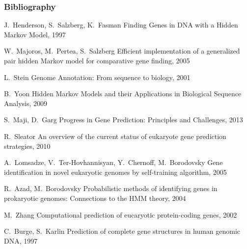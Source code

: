 \documentclass{beamer}[12pt]
\begin{document}
\begin{frame}[allowframebreaks]
  \frametitle<presentation>{Bibliography}    
  \begin{thebibliography}{10}   
	\beamertemplatearticlebibitems
	\bibitem{}
	J.~Henderson, S.~Salzberg, K.~Fasman
	\newblock Finding Genes in DNA with a Hidden Markov Model, 1997
	
	\beamertemplatearticlebibitems
	\bibitem{}
	W.~Majoros, M.~Pertea, S.~Salzberg
	\newblock Efficient implementation of a generalized pair hidden Markov model for comparative gene finding, 2005

	\bibitem{}
	L.~Stein
	\newblock Genome Annotation: From sequence to biology, 2001
	
	\bibitem{}
	B.~Yoon
	\newblock Hidden Markov Models and their Applications in Biological Sequence Analysis, 2009

	\bibitem{}
	S.~Maji, D.~Garg  	
	\newblock Progress in Gene Prediction: Principles and Challenges, 2013
	
	\bibitem{}
	R.~Sleator 	
	\newblock An overview of the current status of eukaryote gene prediction strategies, 2010

	\bibitem{}
	A.~Lomsadze, V.~Ter-Hovhannisyan, Y.~Chernoff, M.~Borodovsky
	\newblock Gene identification in novel eukaryotic genomes by self-training algorithm, 2005

	\bibitem{}
	R.~Azad, M.~Borodovsky
	\newblock Probabilistic methods of identifying genes in prokaryotic genomes: Connections to the HMM theory, 2004

	\bibitem{}
	M.~Zhang
	\newblock Computational prediction of eucaryotic protein-coding genes, 2002

	\bibitem{}
	C.~Burge, S.~Karlin
	\newblock Prediction of complete gene structures in human genomic DNA, 1997  	
  \end{thebibliography}
\end{frame}
\end{document}
